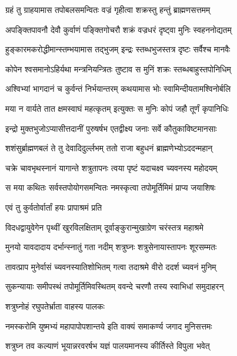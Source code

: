 \twolineshloka
{ग्रहं तु ग्राहयामास तपोबलसमन्वितः}
{वज्रं गृहीत्वा शक्रस्तु हन्तुं ब्राह्मणसत्तमम्}%

\twolineshloka
{अपङ्क्तिपावनौ देवौ कुर्वाणं पङ्क्तिगोचरौ}
{शक्रं वज्रधरं दृष्ट्वा मुनिः स्वहननोद्यतम्}%

\twolineshloka
{हुङ्कारमकरोद्धीमान्स्तम्भयामास तद्भुजम्}
{इन्द्रः स्तब्धभुजस्तत्र दृष्टः सर्वैश्च मानवैः}%

\twolineshloka
{कोपेन श्वसमानोऽहिर्यथा मन्त्रनियन्त्रितः}
{तुष्टाव स मुनिं शक्रः स्तब्धबाहुस्तपोनिधिम्}%

\twolineshloka
{अश्विभ्यां भागदानं च कुर्वन्तं निर्भयान्तरम्}
{कथयामास भोः स्वामिन्दीयतामश्विनोर्बलि}%

\twolineshloka
{मया न वार्यते तात क्षमस्वाघं महत्कृतम्}
{इत्युक्तः स मुनिः कोपं जहौ तूर्णं कृपानिधिः}%

\twolineshloka
{इन्द्रो मुक्तभुजोऽप्यासीत्तदानीं पुरुषर्षभ}
{एतद्वीक्ष्य जनाः सर्वे कौतुकाविष्टमानसाः}%

\twolineshloka
{शशंसुर्ब्राह्मणबलं ते तु देवादिदुर्ल्लभम्}
{ततो राजा बहुधनं ब्राह्मणेभ्योऽददन्महान्}%

\twolineshloka
{चक्रे चावभृथस्नानं यागान्ते शत्रुतापनः}
{त्वया पृष्टं यदाचक्ष्व च्यवनस्य महोदयम्}%

\twolineshloka
{स मया कथितः सर्वस्तपोयोगसमन्वितः}
{नमस्कृत्वा तपोमूर्तिमिमं प्राप्य जयाशिषः}%



\onelineshloka
{एवं तु कुर्वतोर्वार्तां हयः प्रापाश्रमं प्रति}%

\twolineshloka
{विदधद्वायुवेगेन पृथ्वीं खुरविलक्षिताम्}
{दूर्वाङ्कुरान्मुखाग्रेण चरंस्तत्र महाश्रमे}%

\twolineshloka
{मुनयो यावदादाय दर्भान्स्नातुं गता नदीम्}
{शत्रुघ्नः शत्रुसेनायास्तापनः शूरसम्मतः}%

\twolineshloka
{तावत्प्राप मुनेर्वासं च्यवनस्यातिशोभितम्}
{गत्वा तदाश्रमे वीरो ददर्श च्यवनं मुनिम्}%

\twolineshloka
{सुकन्यायाः समीपस्थं तपोमूर्तिमिवस्थितम्}
{ववन्दे चरणौ तस्य स्वाभिधां समुदाहरन्}%

\onelineshloka
{शत्रुघ्नोहं रघुपतेर्भ्राता वाहस्य पालकः}%

\twolineshloka
{नमस्करोमि युष्मभ्यं महापापोपशान्तये}
{इति वाक्यं समाकर्ण्य जगाद मुनिसत्तमः}%

\twolineshloka
{शत्रुघ्न तव कल्याणं भूयान्नरवरर्षभ}
{यज्ञं पालयमानस्य कीर्तिस्ते विपुला भवेत्}%

